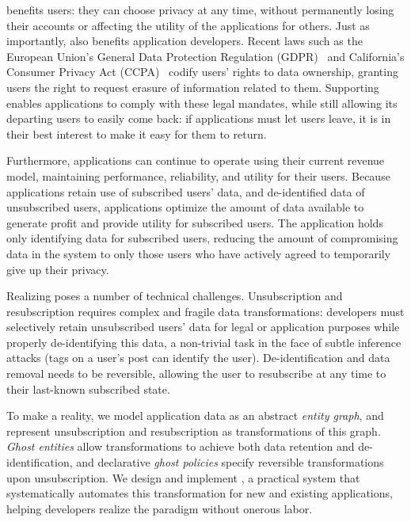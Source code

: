 \name benefits users: they can choose privacy at any time, without
permanently losing their accounts or affecting the utility of the applications for others.  Just as
importantly, \name also benefits application developers. Recent laws such as the
European Union's General Data Protection Regulation (GDPR)~\cite{eu:gdpr} and California's Consumer
Privacy Act (CCPA)~\cite{ca:privacy-act} codify users' rights to data ownership, granting users the
right to request erasure of information related to them. Supporting \name enables
applications to comply with these legal mandates, while still allowing its departing users to easily
come back: if applications must let users leave, it is in their best interest to make it easy for
them to return.

Furthermore, applications can continue to operate using their current revenue model, maintaining
performance, reliability, and utility for their users.  Because applications retain use of
subscribed users' data, and de-identified data of unsubscribed users, applications optimize the
amount of data available to generate profit and provide utility for subscribed users. The
application holds only identifying data for subscribed users, reducing the amount of
compromising data in the system to only those users who have actively agreed to temporarily give up
their privacy.

Realizing \name poses a number of technical challenges.
Unsubscription and resubscription requires complex and fragile data transformations: developers must
selectively retain unsubscribed users' data for legal or application purposes while properly
de-identifying this data, a non-trivial task in the face of subtle inference attacks (\eg tags on a
user's post can identify the user). De-identification and data removal needs to be reversible,
allowing the user to resubscribe at any time to their last-known subscribed state.

To make \name a reality, we model application data as an abstract \emph{entity graph}, and
represent unsubscription and resubscription as transformations of this graph.
\emph{Ghost entities} allow transformations to achieve both data retention and de-identification,
and declarative \emph{ghost policies} specify reversible transformations upon unsubscription.
We design and implement \sys, a practical system that systematically automates this transformation for new and existing applications, helping developers realize the \name paradigm without onerous labor.
\fi

